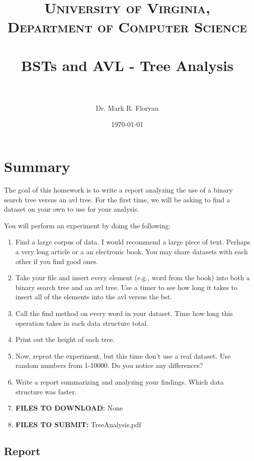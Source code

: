 \documentclass[paper=a4, fontsize=11pt, parskip=full]{scrartcl} %
\title{
\normalfont \normalsize
\textsc{University of Virginia, Department of Computer Science} \\ [25pt] %
\horrule{0.5pt} \\[0.4cm] %
\huge BSTs and AVL - Tree Analysis \\ %
\horrule{2pt} \\[0.5cm] %
}
\author{Dr. Mark R. Floryan} %
\date{\normalsize\today} %
\numberwithin{equation}{section} %
\numberwithin{figure}{section} %
\numberwithin{table}{section} %
\begin{document}
\maketitle %




\section{Summary}

The goal of this homework is to write a report analyzing the use of a binary search tree versus an avl tree. For the first time, we will be asking to find a dataset on your own to use for your analysis. 

You will perform an experiment by doing the following:

\begin{enumerate}
	\item Find a large corpus of data. I would recommend a large piece of text. Perhaps a very long article or a an electronic book. You may share datasets with each other if you find good ones.
	\item Take your file and insert every element (e.g., word from the book) into both a binary search tree and an avl tree. Use a timer to see how long it takes to insert all of the elements into the avl versus the bst.
	\item Call the find method on every word in your dataset. Time how long this operation takes in each data structure total.
	\item Print out the height of each tree.
	\item Now, repeat the experiment, but this time don't use a real dataset. Use random numbers from 1-10000. Do you notice any differences?
	\item Write a report summarizing and analyzing your findings. Which data structure was faster.
	\item \textbf{FILES TO DOWNLOAD:} None
	\item \textbf{FILES TO SUBMIT:} TreeAnalysis.pdf
\end{enumerate}

\subsection{Report}
\end{document}

